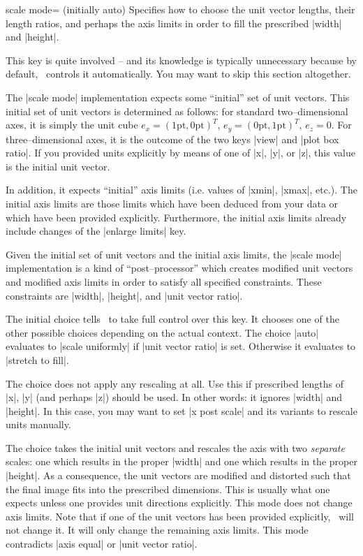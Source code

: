 \begin{pgfplotskey}{scale mode= (initially auto)}
	Specifies how to choose the unit vector lengths, their length ratios, and perhaps the axis limits in order to fill the prescribed |width| and |height|.
	
	This key is quite involved -- and its knowledge is typically unnecessary because by default, \PGFPlots\ controls it automatically. You may want to skip this section altogether.

	The |scale mode| implementation expects some ``initial'' set of unit vectors. This initial set of unit vectors is determined as follows: for standard two--dimensional axes, it is simply the unit cube $e_x=(1\text{pt},0\text{pt})^T$, $e_y=(0\text{pt},1\text{pt})^T$, $e_z=0$. For three--dimensional axes, it is the outcome of the two keys |view| and |plot box ratio|. If you provided units explicitly by means of one of |x|, |y|, or |z|, this value is the initial unit vector.
	
	In addition, it expects ``initial'' axis limits (i.e. values of |xmin|, |xmax|, etc.). The initial axis limits are those limits which have been deduced from your data or which have been provided explicitly. Furthermore, the initial axis limits already include changes of the |enlarge limits| key.

	Given the initial set of unit vectors and the initial axis limits, the |scale mode| implementation is a kind of ``post--processor'' which creates modified unit vectors and modified axis limits in order to satisfy all specified constraints. These constraints are |width|, |height|, and |unit vector ratio|.

	The initial choice  tells \PGFPlots\ to take full control over this key. It chooses one of the other possible choices depending on the actual context. The choice |auto| evaluates to |scale uniformly| if |unit vector ratio| is set. Otherwise it evaluates to |stretch to fill|.

	The choice  does not apply any rescaling at all. Use this if prescribed lengths of |x|, |y| (and perhaps |z|) should be used. In other words: it ignores |width| and |height|. In this case, you may want to set |x post scale| and its variants to rescale units manually.

	The choice  takes the initial unit vectors and rescales the axis with two \emph{separate} scales: one which results in the proper |width| and one which results in the proper |height|. As a consequence, the unit vectors are modified and distorted such that the final image fits into the prescribed dimensions. This is usually what one expects unless one provides unit directions explicitly. This mode does not change axis limits. Note that if one of the unit vectors has been provided explicitly, \PGFPlots\ will not change it. It will only change the remaining axis limits. This mode contradicts |axis equal| or |unit vector ratio|.
	

\end{pgfplotskey}
